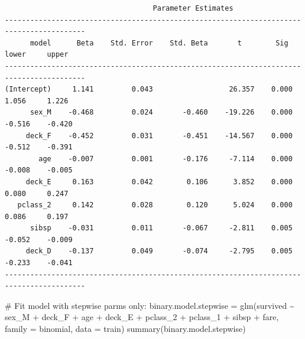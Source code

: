 \documentclass[
  letterpaper,
  DIV=11,
  numbers=noendperiod]{scrartcl}
\newenvironment{Shaded}{\begin{snugshade}}{\end{snugshade}}
\newcommand{\AttributeTok}[1]{\textcolor[rgb]{0.40,0.45,0.13}{#1}}
\newcommand{\CommentTok}[1]{\textcolor[rgb]{0.37,0.37,0.37}{#1}}
\newcommand{\FunctionTok}[1]{\textcolor[rgb]{0.28,0.35,0.67}{#1}}
\newcommand{\NormalTok}[1]{\textcolor[rgb]{0.00,0.23,0.31}{#1}}
\newcommand{\OtherTok}[1]{\textcolor[rgb]{0.00,0.23,0.31}{#1}}
\newcommand{\SpecialCharTok}[1]{\textcolor[rgb]{0.37,0.37,0.37}{#1}}
\begin{document}
\begin{verbatim}
                                   Parameter Estimates                                    
-----------------------------------------------------------------------------------------
      model      Beta    Std. Error    Std. Beta       t        Sig      lower     upper 
-----------------------------------------------------------------------------------------
(Intercept)     1.141         0.043                  26.357    0.000     1.056     1.226 
      sex_M    -0.468         0.024       -0.460    -19.226    0.000    -0.516    -0.420 
     deck_F    -0.452         0.031       -0.451    -14.567    0.000    -0.512    -0.391 
        age    -0.007         0.001       -0.176     -7.114    0.000    -0.008    -0.005 
     deck_E     0.163         0.042        0.106      3.852    0.000     0.080     0.247 
   pclass_2     0.142         0.028        0.120      5.024    0.000     0.086     0.197 
      sibsp    -0.031         0.011       -0.067     -2.811    0.005    -0.052    -0.009 
     deck_D    -0.137         0.049       -0.074     -2.795    0.005    -0.233    -0.041 
-----------------------------------------------------------------------------------------
\end{verbatim}

\begin{Shaded}
\begin{Highlighting}[]
\CommentTok{\# Fit model with stepwise parms only:}
\NormalTok{binary.model.stepwise }\OtherTok{=} \FunctionTok{glm}\NormalTok{(survived }\SpecialCharTok{\textasciitilde{}}\NormalTok{ sex\_M }\SpecialCharTok{+}\NormalTok{ deck\_F  }\SpecialCharTok{+}\NormalTok{ age }\SpecialCharTok{+}\NormalTok{ deck\_E  }\SpecialCharTok{+} 
\NormalTok{                              pclass\_2 }\SpecialCharTok{+}\NormalTok{ pclass\_1 }\SpecialCharTok{+}\NormalTok{ sibsp }\SpecialCharTok{+}\NormalTok{ fare, }
                            \AttributeTok{family =}\NormalTok{ binomial, }\AttributeTok{data =}\NormalTok{ train)}
\FunctionTok{summary}\NormalTok{(binary.model.stepwise)}
\end{Highlighting}
\end{Shaded}
\end{document}
